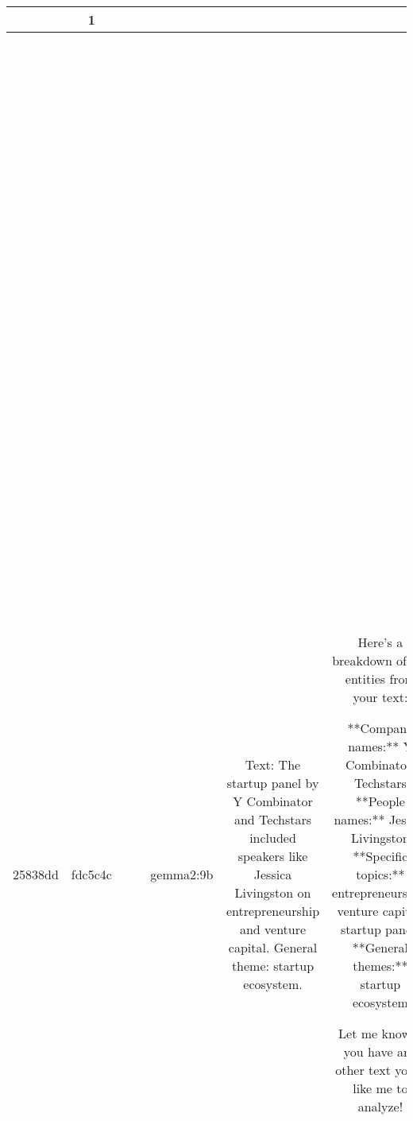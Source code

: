 \begin{table}[h!]
\begin{tabular}{|c|c|c|c|c|c|c|c|c|c|}
{4. **General themes**: The general themes section correctly uses the desired format of a comma-separated list for listing multiple themes. But since it only lists one theme, the use of bullet point is not justified as the required format does not advocate for bullet points.

In summary, the output violates the format rules for "People names," "Specific topics" and "General themes". "Specific topics" should be in a comma-separated list format. Also, "People names" section is potentially incomplete or incorrectly formatted, considering the inclusion of "Jessica Livingston" as a speaker under "Specific topics."

ERR & 1\\
\hline
25838dd & fdc5c4c &  &  & gemma2:9b & Text: The startup panel by Y Combinator and Techstars included speakers like Jessica Livingston on entrepreneurship and venture capital. General theme: startup ecosystem. & Here's a breakdown of the entities from your text:

**Company names:** Y Combinator, Techstars 
**People names:** Jessica Livingston 
**Specific topics:** entrepreneurship, venture capital, startup panels
**General themes:** startup ecosystem  


Let me know if you have any other text you'd like me to analyze! 
 & err & The output is partially compliant with the description provided. 

1. The format for the extracted elements complies with the "Desired format" in the description. The elements are extracted in four categories: Company names, People names, Specific topics, and General themes.

2. Each category is listed separately and uses comma-separated lists as specified.

3. There is, however, an additional closing statement, "Let me know if you have any other text you'd like me to analyze!" which is not part of the desired output format. This extra wording does not conform to the specified format that strictly outlines the structure expected.

For these reasons, the output contains content outside of the specified desired format, leading to non-compliance with the directives.

ERR & 1\\
\hline
b362ebc & fdc5c4c &  &  & llama3.2:1b & Text: An architecture summit by RIBA and AIA with Zaha Hadid and Frank Lloyd Wright highlighted urban design and sustainable architecture. General theme: architectural evolution. & Here are the extracted elements of text:

}
\end{tabular}
\end{table}
